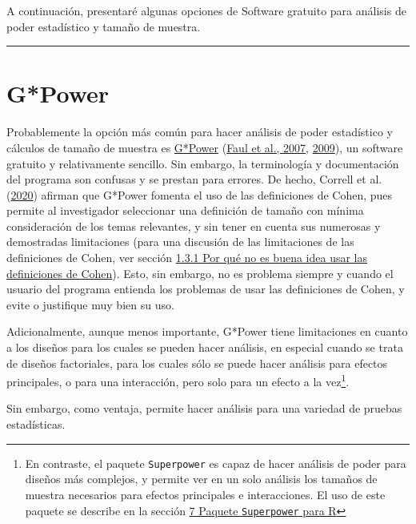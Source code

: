 \documentclass[
]{article}
\begin{document}
A continuación, presentaré algunas opciones de Software gratuito para
análisis de poder estadístico y tamaño de muestra.

\begin{center}\rule{0.5\linewidth}{0.5pt}\end{center}

\hypertarget{gpower}{%
\section{G*Power}\label{gpower}}

Probablemente la opción más común para hacer análisis de poder
estadístico y cálculos de tamaño de muestra es
\href{http://www.psychologie.hhu.de/arbeitsgruppen/allgemeine-psychologie-und-arbeitspsychologie/gpower.html}{G*Power}
(\protect\hyperlink{ref-faulPowerFlexibleStatistical2007}{Faul et al.,
2007}, \protect\hyperlink{ref-faulStatisticalPowerAnalyses2009}{2009}),
un software gratuito y relativamente sencillo. Sin embargo, la
terminología y documentación del programa son confusas y se prestan para
errores. De hecho, Correll et al.
(\protect\hyperlink{ref-correllAvoidCohenSmall2020}{2020}) afirman que
G*Power fomenta el uso de las definiciones de Cohen, pues permite al
investigador seleccionar una definición de tamaño con mínima
consideración de los temas relevantes, y sin tener en cuenta sus
numerosas y demostradas limitaciones (para una discusión de las
limitaciones de las definiciones de Cohen, ver sección
\protect\hyperlink{probs}{1.3.1 Por qué no es buena idea usar las
definiciones de Cohen}). Esto, sin embargo, no es problema siempre y
cuando el usuario del programa entienda los problemas de usar las
definiciones de Cohen, y evite o justifique muy bien su uso.

Adicionalmente, aunque menos importante, G*Power tiene limitaciones en
cuanto a los diseños para los cuales se pueden hacer análisis, en
especial cuando se trata de diseños factoriales, para los cuales sólo se
puede hacer análisis para efectos principales, o para una interacción,
pero solo para un efecto a la vez\footnote{En contraste, el paquete
  \texttt{Superpower} es capaz de hacer análisis de poder para diseños
  más complejos, y permite ver en un solo análisis los tamaños de
  muestra necesarios para efectos principales e interacciones. El uso de
  este paquete se describe en la sección
  \protect\hyperlink{Superpower}{7 Paquete \texttt{Superpower} para R}}.

Sin embargo, como ventaja, permite hacer análisis para una variedad de
pruebas estadísticas.
\end{document}
